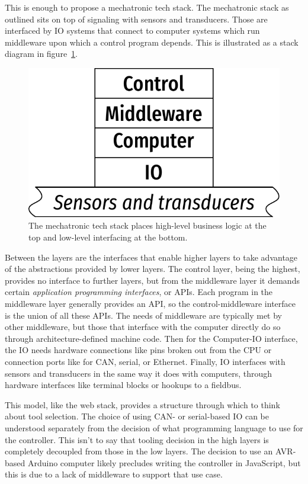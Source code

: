 \documentclass[english,12pt,a4paper,pdftex,eng,utf8]{aaltothesis}
\begin{document}
This is enough to propose a mechatronic tech stack. The mechatronic stack as outlined sits on top of signaling with sensors and transducers. Those are interfaced by IO systems that connect to computer systems which run middleware upon which a control program depends. This is illustrated as a stack diagram in figure~\ref{fig:mechatronic_tech_stack}.

\begin{figure}[h]
  \centering
  \includegraphics[width=\textwidth]{assets/mechatronic_tech_stack}
  \caption{The mechatronic tech stack places high-level business logic at the top and low-level interfacing at the bottom.}\label{fig:mechatronic_tech_stack}
\end{figure}

Between the layers are the interfaces that enable higher layers to take advantage of the abstractions provided by lower layers. The control layer, being the highest, provides no interface to further layers, but from the middleware layer it demands certain \textit{application programming interfaces}, or APIs. Each program in the middleware layer generally provides an API, so the control-middleware interface is the union of all these APIs. The needs of middleware are typically met by other middleware, but those that interface with the computer directly do so through architecture-defined machine code. Then for the Computer-IO interface, the IO needs hardware connections like pins broken out from the CPU or connection ports like for CAN, serial, or Ethernet. Finally, IO interfaces with sensors and transducers in the same way it does with computers, through hardware interfaces like terminal blocks or hookups to a fieldbus.

This model, like the web stack, provides a structure through which to think about tool selection. The choice of using CAN- or serial-based IO can be understood separately from the decision of what programming language to use for the controller. This isn't to say that tooling decision in the high layers is completely decoupled from those in the low layers. The decision to use an AVR-based Arduino computer likely precludes writing the controller in JavaScript, but this is due to a lack of middleware to support that use case.
\end{document}

